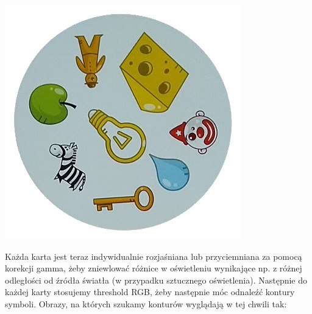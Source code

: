 \documentclass[10pt,a4paper]{article}
\begin{document}
\begin{center}
\includegraphics[scale=0.25]{2.1/card5.jpg}
\end{center}
Każda karta jest teraz indywidualnie rozjaśniana lub przyciemniana za pomocą korekcji gamma, żeby zniewlować różnice w oświetleniu wynikające np. z różnej odległości od źródła światła (w przypadku sztucznego oświetlenia).
Następnie do każdej karty stosujemy threshold RGB, żeby następnie móc odnaleźć kontury symboli. Obrazy, na których szukamy konturów wyglądają w tej chwili tak:\\
\end{document}
